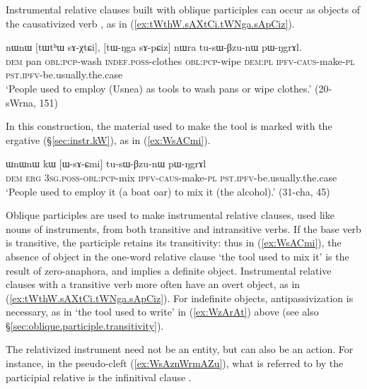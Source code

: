 Instrumental relative clauses built with oblique participles can occur as objects of the causativized verb , as in (\ref{ex:tWthW.sAXtCi.tWNga.sApCiz}).

\begin{exe}
\ex \label{ex:tWthW.sAXtCi.tWNga.sApCiz}
\gll nɯnɯ [tɯtʰɯ sɤ-χtɕi], [tɯ-ŋga sɤ-pɕiz] nɯra tu-sɯ-βzu-nɯ pɯ-ŋgrɤl. \\
\textsc{dem} pan \textsc{obl}:\textsc{pcp}-wash \textsc{indef}.\textsc{poss}-clothes \textsc{obl}:\textsc{pcp}-wipe \textsc{dem}:\textsc{pl} \textsc{ipfv}-\textsc{caus}-make-\textsc{pl} \textsc{pst}.\textsc{ipfv}-be.usually.the.case \\
\glt `People used to employ (Usnea) as tools to wash pans or wipe clothes.' (20-sWrna, 151)
\end{exe} 

In this construction, the material used to make the tool is marked with the ergative (§\ref{sec:instr.kW}), as in (\ref{ex:WsACmi}).

\begin{exe}
\ex \label{ex:WsACmi}
\gll ɯnɯnɯ kɯ [ɯ-sɤ-ɕmi] tu-sɯ-βzu-nɯ pɯ-ŋgrɤl \\
\textsc{dem} \textsc{erg} \textsc{3sg}.\textsc{poss}-\textsc{obl}:\textsc{pcp}-mix \textsc{ipfv}-\textsc{caus}-make-\textsc{pl} \textsc{pst}.\textsc{ipfv}-be.usually.the.case \\
\glt `People used to employ it (a boat oar) to mix it (the alcohol).' (31-cha, 45)
\end{exe}  

Oblique participles are used to make instrumental relative clauses, used like nouns of instruments, from both transitive and intransitive verbs. If the base verb is transitive, the participle retains its transitivity: thus in (\ref{ex:WsACmi}), the absence of object in the one-word relative clause  `the tool used to mix it' is the result of zero-anaphora, and implies a definite object. Instrumental relative clauses with a transitive verb more often have an overt object, as in (\ref{ex:tWthW.sAXtCi.tWNga.sApCiz}). For indefinite objects, antipassivization is necessary, as in  `the tool used to write' in (\ref{ex:WzArAt}) above (see also  §\ref{sec:oblique.participle.transitivity}). 

The relativized instrument need not be an entity, but can also be an action. For instance, in the pseudo-cleft (\ref{ex:WsAznWrmAZu}), what is referred to by the participial relative is the infinitival clause .

